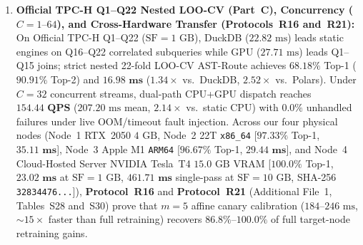 \documentclass[10pt,a4paper]{article}
\begin{document}
\begin{enumerate}[leftmargin=1.5em,itemsep=1pt]
    \item \textbf{Official TPC-H Q1--Q22 Nested LOO-CV (Part~C), Concurrency ($C=1\text{--}64$), and Cross-Hardware Transfer (\textbf{Protocols~R16 and~R21}):} On Official TPC-H Q1--Q22 ($\text{SF}=1\text{ GB}$), DuckDB ($22.82\text{ ms}$) leads static engines on Q16--Q22 correlated subqueries while GPU ($27.71\text{ ms}$) leads Q1--Q15 joins; strict nested 22-fold LOO-CV AST-Route achieves $\mathbf{68.18\%}$ Top-1 ($\mathbf{90.91\%}$ Top-2) and $\mathbf{16.98\text{ ms}}$ ($\mathbf{1.34\times}$ vs.\ DuckDB, $\mathbf{2.52\times}$ vs.\ Polars). Under $C=32$ concurrent streams, dual-path CPU+GPU dispatch reaches $\mathbf{154.44\text{ QPS}}$ ($207.20\text{ ms}$ mean, $2.14\times$ vs.\ static CPU) with $0.0\%$ unhandled failures under live OOM/timeout fault injection. Across our four physical nodes (Node~1 RTX~2050 $4\text{ GB}$, Node~2 22T \texttt{x86\_64} [$\mathbf{97.33\%}$ Top-1, $\mathbf{35.11\text{ ms}}$], Node~3 Apple M1 \texttt{ARM64} [$\mathbf{96.67\%}$ Top-1, $\mathbf{29.44\text{ ms}}$], and Node~4 Cloud-Hosted Server NVIDIA Tesla~T4 $15.0\text{ GB}$ VRAM [$\mathbf{100.0\%}$ Top-1, $\mathbf{23.02\text{ ms}}$ at $\text{SF}=1\text{ GB}$, $\mathbf{461.71\text{ ms}}$ single-pass at $\text{SF}=10\text{ GB}$, SHA-256 \texttt{32834476...}]), \textbf{Protocol~R16} and \textbf{Protocol~R21} (\label{sec:v9_sec3_2_multiscale_sf100_audit}Additional File~1, Tables~S28 and~S30) prove that $m=5$ affine canary calibration ($184\text{--}246\text{ ms}$, $\sim 15\times$ faster than full retraining) recovers $\mathbf{86.8\%\text{--}100.0\%}$ of full target-node retraining gains.
\end{enumerate}
\end{document}

